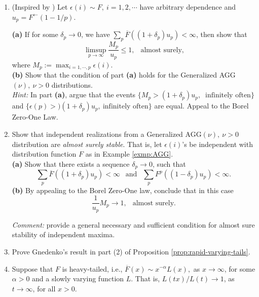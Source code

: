 
\begin{enumerate}

 \item (Inspired by \cite{resnick1973almost}) Let $\epsilon(i)\sim F,\ i=1,2,\cdots$ have arbitrary dependence 
 and $u_p = F^{\leftarrow}(1-1/p)$. 
 
 {\bf (a)}   If for some $\delta_p\to 0$,
 we have $\sum_{p} \overline{F}((1+\delta_p)u_p) <\infty$, then show that
 $$
 \limsup_{p\to\infty} \frac{M_p}{u_p} \le 1,\ \ \mbox{ almost surely,} 
 $$
 where $M_p:= \max_{i=1,\cdots,p} \epsilon(i)$.\\
 
 {\bf (b)} Show that the condition of part {\bf (a)} holds for the Generalized AGG$(\nu),\ \nu>0$ distributions.\\
 
 {\em Hint:} In part {\bf (a)}, argue that the events $\{ M_p > (1+\delta_p) u_p,\ \mbox{ infinitely often}\}$ and
  $\{\epsilon(p) > )(1+\delta_p)u_p, \ \mbox{infinitely often}\}$ are equal. Appeal to the Borel Zero-One Law.\\
 
 \item  Show that independent realizations from a Generalized AGG$(\nu),\ \nu>0$ distribution
  are {\em almost surely stable}. That is, let $\epsilon(i)$'s be independent with distribution function $F$ as in Example \ref{exmp:AGG}.\\

{\bf (a)} Show that there exists a sequence $\delta_p\to 0$, such that 
$$
\sum_p \overline F((1+\delta_p)u_p) <\infty\ \ \mbox{ and }\ \  \sum_p F^p((1-\delta_p)u_p) <\infty.
$$
 {\bf (b)} By appealing to the Borel Zero-One law, conclude that in this case
 $$
 \frac{1}{u_p} M_p {\longrightarrow} 1,\ \ \mbox{ almost surely}.
 $$

{\em Comment:} 
\cite{resnick1973almost} provide a general necessary and sufficient condition for almost sure stability of independent maxima.\\
 
 \item Prove Gnedenko's result in part (2) of Proposition \ref{prop:rapid-varying-tails}.\\
 
\item Suppose that $F$ is heavy-tailed, i.e., $\overline F(x) \sim x^{-\alpha} L(x),$ as $x\to\infty$, for some $\alpha>0$ and a
slowly varying function $L$.  That is, $L(tx)/L(t)\to 1$, as $t\to\infty$, for all $x>0$.\\


\end{enumerate}
